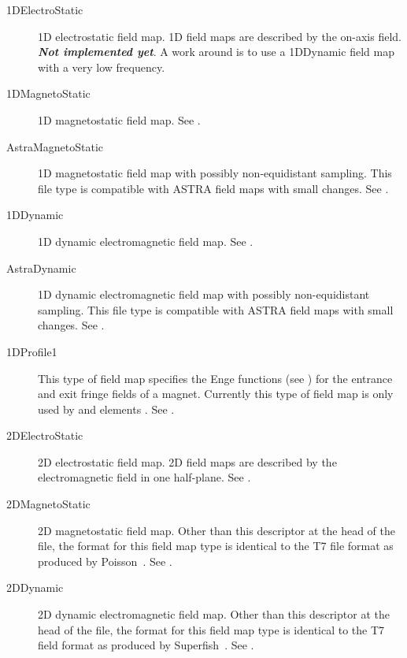 \begin{description}
\item[1DElectroStatic] \Newline
1D electrostatic field map. 1D field maps are described by the on-axis field.\\
\textbf{\emph{Not implemented yet}}. A work around is to use a 1DDynamic field map with a very low frequency.

\item[1DMagnetoStatic] \Newline
1D magnetostatic field map. See .

\item[AstraMagnetoStatic] \Newline
1D magnetostatic field map with possibly non-equidistant sampling. This file type is compatible with ASTRA field maps
with small changes. See .

\item[1DDynamic] \Newline
1D dynamic electromagnetic field map. See .

\item[AstraDynamic] \Newline
1D dynamic electromagnetic field map with possibly non-equidistant sampling. This file type is compatible with ASTRA
field maps with small changes. See .

\item[1DProfile1] \Newline
This type of field map specifies the Enge functions (see \cite{enge}) for the entrance and exit fringe fields of a
magnet. Currently this type of field map is only used by  and
 elements . See .

\item[2DElectroStatic] \Newline
2D electrostatic field map. 2D field maps are described by the electromagnetic field in one half-plane.
See .

\item[2DMagnetoStatic] \Newline
2D magnetostatic field map. Other than this descriptor at the head of the file, the format for this field map type
is identical to the T7 file format as produced by Poisson~\cite{superfish}. See .

\item[2DDynamic] \Newline
2D dynamic electromagnetic field map. Other than this descriptor at the head of the file, the format for this field
map type is identical to the T7 field format as produced by Superfish~\cite{superfish}. See .


\end{description}
